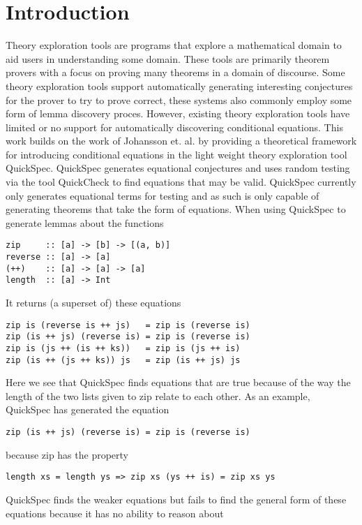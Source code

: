 \section{Introduction}
Theory exploration tools are programs that
explore a mathematical domain to aid users in
understanding some domain. %
These tools are primarily theorem provers with a focus
on proving many theorems in a domain of discourse.
Some theory exploration tools support automatically generating
interesting conjectures for the prover to try to prove correct,
these systems also commonly employ some form of lemma discovery proces\cite{heras2013}.
However, existing theory exploration tools have limited or no
support for automatically discovering conditional equations. %
This work builds on the work of Johansson et. al. \cite{Johansson2014}
by providing a theoretical framework for introducing conditional
equations in the light weight theory exploration tool QuickSpec.\cite{Claessen2010} 
QuickSpec generates equational conjectures and uses random testing via the tool QuickCheck \cite{Claessen2000}
to find equations that may be valid. QuickSpec currently only generates
equational terms for testing and as such is only capable of generating
theorems that take the form of equations. 
When using QuickSpec to generate lemmas about the functions
\begin{verbatim}
zip     :: [a] -> [b] -> [(a, b)]
reverse :: [a] -> [a]
(++)    :: [a] -> [a] -> [a]
length  :: [a] -> Int
\end{verbatim}
It returns (a superset of) these equations
\begin{verbatim}
zip is (reverse is ++ js)   = zip is (reverse is)
zip (is ++ js) (reverse is) = zip is (reverse is)
zip is (js ++ (is ++ ks))   = zip is (js ++ is)
zip (is ++ (js ++ ks)) js   = zip (is ++ js) js
\end{verbatim}
Here we see that QuickSpec finds equations that are true
because of the way the length of the two lists given to zip relate
to each other. As an example, QuickSpec has generated the equation
\begin{verbatim}zip (is ++ js) (reverse is) = zip is (reverse is)\end{verbatim}
because zip has the property \begin{verbatim}length xs = length ys => zip xs (ys ++ is) = zip xs ys\end{verbatim}
QuickSpec finds the weaker equations but fails to find the general form
of these equations because it has no ability to reason about
